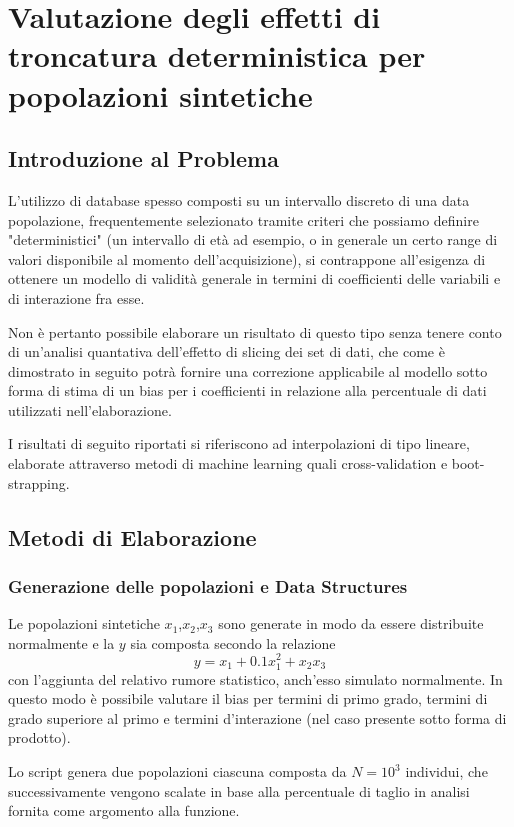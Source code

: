 \documentclass[a4paper]{report}
\begin{document}
\chapter{Valutazione degli effetti di troncatura deterministica per popolazioni sintetiche}

\section{Introduzione al Problema}
L'utilizzo di database spesso composti su un intervallo discreto di una data popolazione, frequentemente selezionato tramite criteri che possiamo definire "deterministici" (un intervallo di età ad esempio, o in generale un certo range di valori disponibile al momento dell'acquisizione), si contrappone all'esigenza di ottenere un modello di validità generale in termini di coefficienti delle variabili e di interazione fra esse.

Non è pertanto possibile elaborare un risultato di questo tipo senza tenere conto di un'analisi quantativa dell'effetto di slicing dei set di dati, che come è dimostrato in seguito potrà fornire una correzione applicabile al modello sotto forma di stima di un bias per i coefficienti in relazione alla percentuale di dati utilizzati nell'elaborazione.

I risultati di seguito riportati si riferiscono ad interpolazioni di tipo lineare, elaborate attraverso metodi di machine learning quali cross-validation e boot-strapping.

\section{Metodi di Elaborazione}
\subsection {Generazione delle popolazioni e Data Structures}
Le popolazioni sintetiche $x_1$,$x_2$,$x_3$ sono generate in modo da essere distribuite normalmente e la $y$ sia composta secondo la relazione \[y=x_1+0.1x_1^2+x_2x_3\]con l'aggiunta del relativo rumore statistico, anch'esso simulato normalmente.
In questo modo è possibile valutare il bias per termini di primo grado, termini di grado superiore al primo e termini d'interazione (nel caso presente sotto forma di prodotto).

Lo script genera due popolazioni ciascuna composta da $N=10^3$ individui, che successivamente vengono scalate in base alla percentuale di taglio in analisi fornita come argomento alla funzione.
\end{document}
